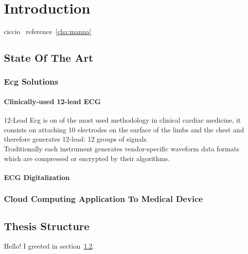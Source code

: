 
\chapter{Introduction}
ciccio~\label{cha:manna}
reference~\ref{cha:manna}

\section{State Of The Art}
\subsection{Ecg Solutions}
\subsubsection{Clinically-used 12-lead ECG}
12-Lead Ecg is on of the most used methodology in clinical cardiac medicine, it consists on attaching 10 electrodes on the surface of the limbs and the chest and therefore generates 12-lead: 12 groups of signals.\\
Traditionally each instrument generates vendor-specific waveform data formats which are compressed or encrypted by their algorithms.
\subsubsection{ECG Digitalization}
\subsection{Cloud Computing Application To Medical Device}


\section{Thesis Structure}
\label{sec:greetings}

Hello!
I greeted in section~\ref{sec:greetings}.